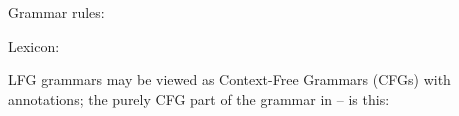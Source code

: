 \documentclass[output=paper,hidelinks]{langscibook}
\begin{document}
\begin{description}
\item[Grammar rules:]
\begin{exe} \sn \end{exe}
\ea\label{r:s}
\ex\label{r:vp}
\ex\label{r:np}
\z

\item[Lexicon:]\largerpage[1.5]
\begin{exe} \sn \end{exe}
\ea\label{le:loves} 
\ex\label{le:she} 
\ex\label{le:you} 
\z
\end{description}

LFG grammars may be viewed as Context\hyp{}Free Grammars (CFGs) with annotations; the purely CFG part of the grammar in -- is this:\largerpage
\end{document}
